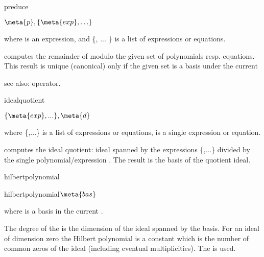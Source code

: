 \begin{Operator}{preduce}
\begin{Syntax}

 \(\meta{p}, \{\meta{exp}, \ldots \}\)

\end{Syntax}

where  is an expression, and \{, ... \} is
a list of expressions or equations.


 computes the remainder of 
modulo the given set of polynomials resp. equations.
This result is unique (canonical) only if the given set
is a  basis under the current 

see also:  operator.

\end{Operator}



\begin{Operator}{idealquotient}
\begin{Syntax}


\(\{\meta{exp}, ...\}, \meta{d}\)

\end{Syntax}
where \{,...\} is a list of 
expressions or equations,   is a single expression or equation.


 computes the ideal quotient:
ideal spanned by the expressions \{,...\}
divided by the single polynomial/expression . The result
is the  basis of the quotient ideal.
\end{Operator}
\begin{Operator}{hilbertpolynomial}
\begin{Syntax}

  hilbertpolynomial\(\meta{bas}\)

\end{Syntax}
where  is a  basis in the
current .

The degree of the  is the
dimension of the ideal spanned by the basis. For an
ideal of dimension zero the Hilbert polynomial is a
constant which is the number of common zeros of the
ideal (including eventual multiplicities).
The  is used.
\end{Operator}

